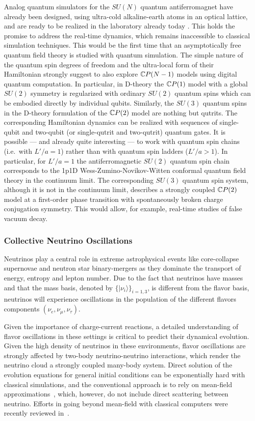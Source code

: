 Analog quantum simulators for the $SU(N)$ quantum antiferromagnet have already been designed, using ultra-cold alkaline-earth atoms in an optical lattice, and are ready to be realized in the laboratory already today
\cite{laflamme2016cp}. 
This holds the promise to address the real-time dynamics, which remains inaccessible to classical simulation techniques. This would be the first time that an asymptotically free quantum field theory is studied with quantum simulation.
The simple nature of the quantum spin degrees of freedom and the ultra-local form of their Hamiltonian strongly suggest to also explore ${\mathbb{C}P}(N-1)$ models using digital quantum computation. 
In particular, in D-theory the ${\mathbb{C}P}(1)$ model with a global $SU(2)$ symmetry is regularized with ordinary $SU(2)$ quantum spins which can be embodied directly by individual qubits. 
Similarly, the $SU(3)$ quantum spins in the D-theory formulation of the ${\mathbb{C}P}(2)$ model are nothing but qutrits. 
The corresponding Hamiltonian dynamics can be realized with sequences of single-qubit and two-qubit (or single-qutrit and two-qutrit) quantum gates.
It is possible --- and already quite interesting --- to work with quantum spin chains (i.e.\ with $L'/a = 1$) rather than with quantum spin ladders ($L'/a > 1$).
In particular, for $L'/a = 1$ the antiferromagnetic  $SU(2)$ quantum spin chain corresponds to the \gls{1p1D} Wess-Zumino-Novikov-Witten conformal quantum  field theory in the continuum limit.
The corresponding $SU(3)$ quantum spin system, although it is not in the continuum limit, describes a strongly coupled ${\mathbb{C}P}(2)$ model at a first-order phase transition with spontaneously broken 
charge conjugation symmetry. 
This would allow, for example, real-time studies of false vacuum decay.


\subsubsection{Collective Neutrino Oscillations}
 
Neutrinos play a central role in extreme astrophysical events like core-collapse supernovae and neutron star binary-mergers as they dominate the transport of energy, entropy and lepton number. Due to the fact that neutrinos have masses and that 
the mass basis, denoted by $\{ | \nu_i \rangle\}_{i=1,3}$, is different from the flavor basis, neutrinos will experience oscillations in the population of the different flavors  components $(\nu_e, \nu_\mu , \nu_\tau)$. 

Given the importance of charge-current reactions, a detailed understanding of flavor oscillations in these settings is critical to predict their dynamical evolution. Given the high density of neutrinos in these environments, flavor oscillations are strongly affected by two-body neutrino-neutrino interactions, which render the neutrino cloud a strongly coupled many-body system. Direct solution of the evolution equations for general initial conditions can be exponentially hard with classical simulations, and the conventional approach is to rely on mean-field approximations~\cite{Duan2006,Duan2010,Tamborra2021}, which, however, do not include direct scattering between neutrino. Efforts in going beyond mean-field with classical computers were recently reviewed in~\cite{Patwardhan2023}. 

